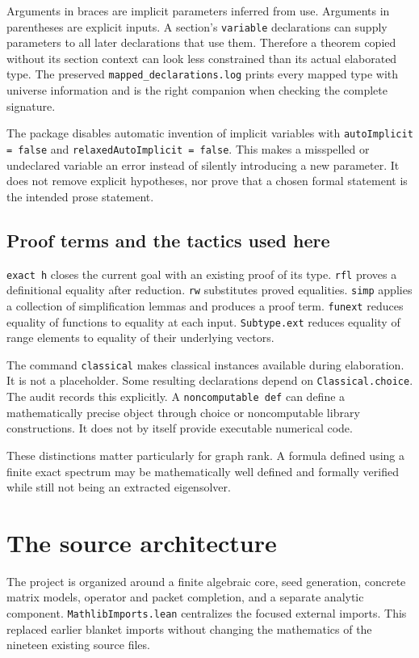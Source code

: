 \documentclass[11pt,a4paper]{article}
\newcommand{\code}[1]{\nolinkurl{#1}}
\begin{document}
Arguments in braces are implicit parameters inferred from use. Arguments in parentheses are explicit inputs. A section's \code{variable} declarations can supply parameters to all later declarations that use them. Therefore a theorem copied without its section context can look less constrained than its actual elaborated type. The preserved \code{mapped_declarations.log} prints every mapped type with universe information and is the right companion when checking the complete signature.

The package disables automatic invention of implicit variables with \code{autoImplicit = false} and \code{relaxedAutoImplicit = false}. This makes a misspelled or undeclared variable an error instead of silently introducing a new parameter. It does not remove explicit hypotheses, nor prove that a chosen formal statement is the intended prose statement.

\subsection{Proof terms and the tactics used here}

\code{exact h} closes the current goal with an existing proof of its type. \code{rfl} proves a definitional equality after reduction. \code{rw} substitutes proved equalities. \code{simp} applies a collection of simplification lemmas and produces a proof term. \code{funext} reduces equality of functions to equality at each input. \code{Subtype.ext} reduces equality of range elements to equality of their underlying vectors.

The command \code{classical} makes classical instances available during elaboration. It is not a placeholder. Some resulting declarations depend on \code{Classical.choice}. The audit records this explicitly. A \code{noncomputable def} can define a mathematically precise object through choice or noncomputable library constructions. It does not by itself provide executable numerical code.

These distinctions matter particularly for graph rank. A formula defined using a finite exact spectrum may be mathematically well defined and formally verified while still not being an extracted eigensolver.

\section{The source architecture}

The project is organized around a finite algebraic core, seed generation, concrete matrix models, operator and packet completion, and a separate analytic component. \code{MathlibImports.lean} centralizes the focused external imports. This replaced earlier blanket imports without changing the mathematics of the nineteen existing source files.
\end{document}
